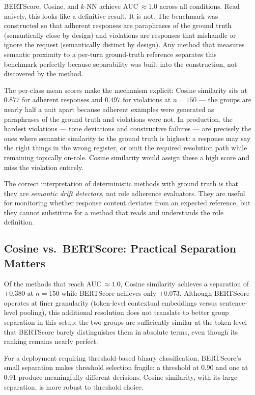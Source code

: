 \documentclass[11pt,a4paper]{article}
\begin{document}
BERTScore, Cosine, and $k$-NN achieve AUC\,$\approx 1.0$ across all conditions.
Read naively, this looks like a definitive result. It is not. The benchmark
was constructed so that adherent responses are paraphrases of the ground truth
(semantically close by design) and violations are responses that mishandle or
ignore the request (semantically distinct by design). Any method that measures
semantic proximity to a per-turn ground-truth reference separates this benchmark
perfectly because separability was built into the construction, not discovered
by the method.

The per-class mean scores make the mechanism explicit: Cosine similarity
sits at $0.877$ for adherent responses and $0.497$ for violations at $n = 150$
--- the groups are nearly half a unit apart because adherent examples were
generated as paraphrases of the ground truth and violations were not. In
production, the hardest violations --- tone deviations and constructive
failures --- are precisely the ones where semantic similarity to the ground
truth is highest: a response may say the right things in the wrong register, or
omit the required resolution path while remaining topically on-role. Cosine
similarity would assign these a high score and miss the violation entirely.

The correct interpretation of deterministic methods with ground truth is that
they are \emph{semantic drift detectors}, not role adherence evaluators. They
are useful for monitoring whether response content deviates from an expected
reference, but they cannot substitute for a method that reads and understands
the role definition.

\subsection{Cosine vs.\ BERTScore: Practical Separation Matters}

Of the methods that reach AUC\,$\approx 1.0$, Cosine similarity achieves a
separation of $+0.380$ at $n = 150$ while BERTScore achieves only $+0.073$.
Although BERTScore operates at finer granularity (token-level contextual
embeddings versus sentence-level pooling), this additional resolution does not
translate to better group separation in this setup: the two groups are
sufficiently similar at the token level that BERTScore barely distinguishes
them in absolute terms, even though its ranking remains nearly perfect.

For a deployment requiring threshold-based binary classification, BERTScore's
small separation makes threshold selection fragile: a threshold at 0.90 and
one at 0.91 produce meaningfully different decisions. Cosine similarity, with
its large separation, is more robust to threshold choice.
\end{document}
